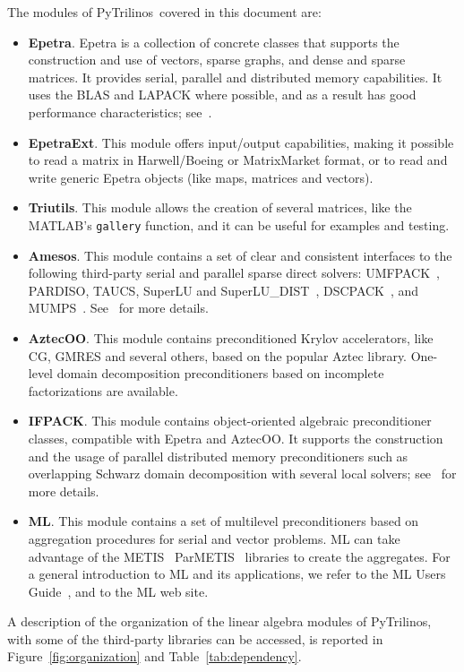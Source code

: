 \documentclass[10pt,relax]{SANDreport}
\newcommand{\PyTrilinos}{{PyTrilinos}}
\begin{document}
The modules of \PyTrilinos\ covered in this document are:
\begin{itemize}
\item {\bf Epetra}. Epetra is a collection
of concrete classes that supports the construction and use of vectors, sparse
graphs, and dense and sparse matrices. It provides serial, parallel and
distributed memory capabilities. It uses the BLAS and LAPACK where possible,
  and as a result has good performance characteristics;
see~\cite{Epetra-Ref-Guide}.
%
\item {\bf EpetraExt}. This module offers input/output
capabilities, making it possible to read a matrix in Harwell/Boeing or
MatrixMarket format, or to read and write generic Epetra objects 
(like maps, matrices and vectors).
%
\item {\bf Triutils}. This module allows the creation of several matrices, 
  like the MATLAB's {\tt gallery} function, and it can be useful for examples
  and testing. 
%
\item {\bf Amesos}. This module contains a set of clear and consistent
interfaces to the following third-party serial and parallel sparse direct
solvers:
UMFPACK~\cite{umfpack-home-page},
PARDISO,
TAUCS,
SuperLU and SuperLU\_DIST~\cite{superlu-manual},
DSCPACK~\cite{dscpack-manual}, and 
MUMPS~\cite{mumps-manual}. See~\cite{Amesos-Reference-Guide} for more details. 
%
\item {\bf AztecOO}. This module contains preconditioned Krylov accelerators,
like CG, GMRES and several others, based on the popular Aztec library.
One-level domain decomposition preconditioners based on incomplete
factorizations are available.
%
\item {\bf IFPACK}. This module contains object-oriented algebraic
preconditioner
classes, compatible with Epetra and AztecOO.  It supports the construction and
the usage of parallel distributed memory preconditioners such as overlapping
Schwarz domain decomposition with several local solvers;
see~\cite{ifpack-guide} for more details.
%
\item {\bf ML}. This module contains a set of multilevel preconditioners based
on aggregation procedures for serial and vector problems. ML can take
advantage of the 
METIS~\cite{metis}
ParMETIS~\cite{parmetis} libraries to create the aggregates.
For a general introduction to ML and its applications, we refer to
the ML Users Guide~\cite{ml-guide}, and to the ML web site.
\end{itemize}

A description of the organization of  the linear algebra modules of
PyTrilinos, with some of the third-party libraries can be accessed,
is reported in Figure~\ref{fig:organization} and Table~\ref{tab:dependency}.
\end{document}
